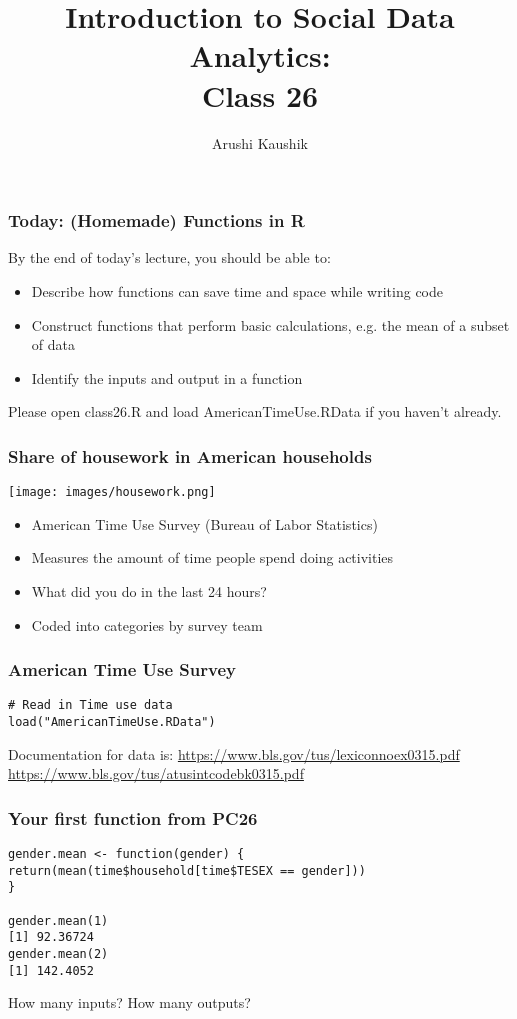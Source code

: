 \documentclass[handout,compress]{beamer}
\title[Class 26]{Introduction to Social Data Analytics: \\
Class 26}
\author[Kaushik]{Arushi Kaushik}
\institute[UCSD]{arkaushi@ucsd.edu}
\date[]{}
\begin{document}
\frame{\titlepage}

\begin{frame}
\frametitle{Today: (Homemade) Functions in R}
By the end of today's lecture, you should be able to:
\begin{itemize}
	\item Describe how functions can save time and space while writing code
	\item Construct functions that perform basic calculations, e.g. the mean of a subset of data
	\item Identify the inputs and output in a function
\end{itemize} \bigskip
Please open class26.R and load AmericanTimeUse.RData if you haven't already.
\end{frame}

\begin{frame}[fragile]
 \frametitle{Share of housework in American households}
 \begin{center}
 \texttt{[image: images/housework.png]}
 \end{center}
 \begin{itemize}
\item \alert{American Time Use Survey} (Bureau of Labor Statistics)
\item Measures the amount of \alert{time} people spend doing activities
\item What did you do in the \alert{last 24 hours}?
\item Coded into \alert{categories} by survey team
\end{itemize}
\end{frame}

\begin{frame}[fragile]
 \frametitle{American Time Use Survey}
\begin{verbatim}
# Read in Time use data
load("AmericanTimeUse.RData")
\end{verbatim}
Documentation for data is:
\url{https://www.bls.gov/tus/lexiconnoex0315.pdf}
\url{https://www.bls.gov/tus/atusintcodebk0315.pdf}
\end{frame}

\begin{frame}[fragile]
\frametitle{Your first function from PC26}
\begin{verbatim}
gender.mean <- function(gender) {
return(mean(time$household[time$TESEX == gender]))
}

gender.mean(1)
[1] 92.36724
gender.mean(2)
[1] 142.4052
\end{verbatim} \bigskip
How many inputs? How many outputs?

\end{frame}
\end{document}
